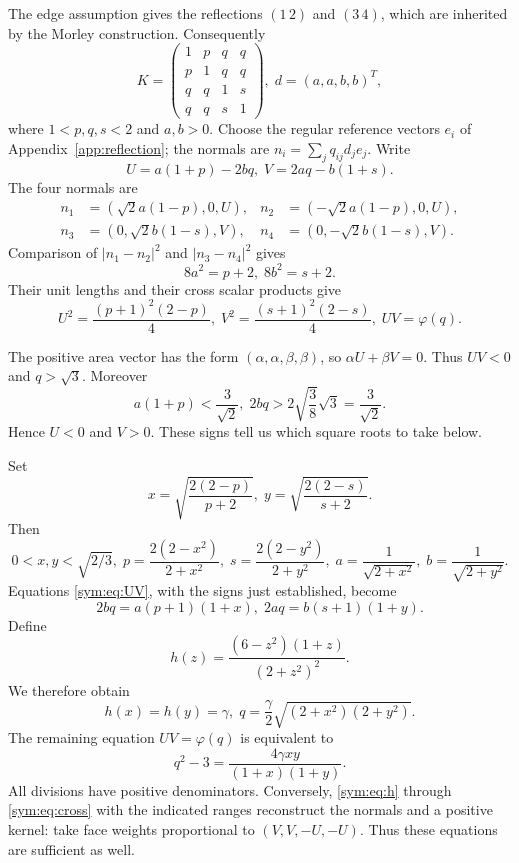\documentclass[11pt]{article}
\theoremstyle{definition}
\theoremstyle{remark}
\newcommand{\ph}{\varphi}
\begin{document}
The edge assumption gives the reflections $(1\,2)$ and $(3\,4)$,
which are inherited by the Morley construction. Consequently
\begin{equation}
K=\begin{pmatrix}
1&p&q&q\\p&1&q&q\\q&q&1&s\\q&q&s&1
\end{pmatrix},\;
d=(a,a,b,b)^T,
\label{sym:eq:two}
\end{equation}
where $1<p,q,s<2$ and $a,b>0$.
Choose the regular reference vectors $e_i$ of Appendix~\ref{app:reflection}; the normals are $n_i=\sum_jq_{ij}d_je_j$. Write
\[
U=a(1+p)-2bq,\; V=2aq-b(1+s).
\]
The four normals are
\[
\begin{aligned}
n_1&=(\sqrt2a(1-p),0,U),&
n_2&=(-\sqrt2a(1-p),0,U),\\
n_3&=(0,\sqrt2b(1-s),V),&
n_4&=(0,-\sqrt2b(1-s),V).
\end{aligned}
\]
Comparison of $|n_1-n_2|^2$ and $|n_3-n_4|^2$ gives
\begin{equation}
8a^2=p+2,\; 8b^2=s+2.
\label{sym:eq:ab}
\end{equation}
Their unit lengths and their cross scalar products give
\begin{equation}
U^2=\frac{(p+1)^2(2-p)}4,\;
V^2=\frac{(s+1)^2(2-s)}4,\;
UV=\ph(q).
\label{sym:eq:UV}
\end{equation}

The positive area vector has the form $(\alpha,\alpha,\beta,\beta)$,
so $\alpha U+\beta V=0$. Thus $UV<0$ and $q>\sqrt3$.
Moreover
\[
a(1+p)<\frac3{\sqrt2},\;
2bq>2\sqrt{\frac38}\sqrt3=\frac3{\sqrt2}.
\]
Hence $U<0$ and $V>0$. These signs tell us which square roots to take below.

Set
\begin{equation}
x=\sqrt{\frac{2(2-p)}{p+2}},\;
y=\sqrt{\frac{2(2-s)}{s+2}}.
\label{sym:eq:xy}
\end{equation}
Then
\[
0<x,y<\sqrt{2/3},\;
p=\frac{2(2-x^2)}{2+x^2},\;
s=\frac{2(2-y^2)}{2+y^2},\;
a=\frac1{\sqrt{2+x^2}},\; b=\frac1{\sqrt{2+y^2}}.
\]
Equations \eqref{sym:eq:UV}, with the signs just established, become
\[
2bq=a(p+1)(1+x),\;
2aq=b(s+1)(1+y).
\]
Define
\[
h(z)=\frac{(6-z^2)(1+z)}{(2+z^2)^2}.
\]
We therefore obtain
\begin{equation}
h(x)=h(y)=\gamma,\;
q=\frac{\gamma}{2}\sqrt{(2+x^2)(2+y^2)}.
\label{sym:eq:h}
\end{equation}
The remaining equation $UV=\ph(q)$ is equivalent to
\begin{equation}
q^2-3=\frac{4\gamma xy}{(1+x)(1+y)}.
\label{sym:eq:cross}
\end{equation}
All divisions have positive denominators. Conversely,
\eqref{sym:eq:h} through \eqref{sym:eq:cross} with the indicated ranges reconstruct
the normals and a positive kernel: take face weights proportional
to $(V,V,-U,-U)$. Thus these equations are sufficient as well.
\end{document}
